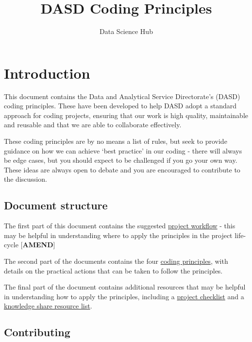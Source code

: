 \documentclass[]{book}
\title{DASD Coding Principles}
\author{Data Science Hub}
\date{}
\begin{document}
\maketitle

{
\setcounter{tocdepth}{1}
\tableofcontents
}
\hypertarget{intro}{%
\chapter*{Introduction}\label{intro}}

This document contains the Data and Analytical Service Directorate's (DASD) coding principles. These have been developed to help DASD adopt a standard approach for coding projects, ensuring that our work is high quality, maintainable and reusable and that we are able to collaborate effectively.

These coding principles are by no means a list of rules, but seek to provide guidance on how we can achieve `best practice' in our coding - there will always be edge cases, but you should expect to be challenged if you go your own way. These ideas are always open to debate and you are encouraged to contribute to the discussion.

\hypertarget{structure}{%
\section*{Document structure}\label{structure}}

The first part of this document contains the suggested \protect\hyperlink{wf}{project workflow} - this may be helpful in understanding where to apply the principles in the project life-cycle {[}\textbf{AMEND}{]}

The second part of the documents contains the four \protect\hyperlink{principles}{coding principles}, with details on the practical actions that can be taken to follow the principles.

The final part of the document contains additional resources that may be helpful in understanding how to apply the principles, including a \protect\hyperlink{checklist}{project checklist} and a \protect\hyperlink{ksresources}{knowledge share resource list}.

\hypertarget{contributing}{%
\section*{Contributing}\label{contributing}}
\end{document}
